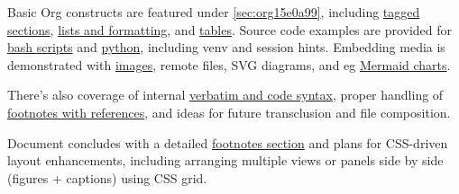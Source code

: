\documentclass[11pt]{article}
\begin{document}
Basic Org constructs are featured under \ref{sec:org15e0a99}, including \hyperref[sec:org37ce046]{tagged sections}, \hyperref[sec:org93ad3dd]{lists and formatting}, and \hyperref[sec:org82d6613]{tables}. Source code examples are provided for \hyperref[sec:org603edab]{bash scripts} and \hyperref[sec:org3497437]{python}, including venv and session hints. Embedding media is demonstrated with \hyperref[sec:orge89f838]{images}, remote files, SVG diagrams, and eg \hyperref[sec:orged0df6e]{Mermaid charts}. 

There's also coverage of internal \hyperref[sec:org51f3ec8]{verbatim and code syntax}, proper handling of \hyperref[sec:orgebe5961]{footnotes with references}, and ideas for future transclusion and file composition.

Document concludes with a detailed \hyperref[sec:orgebe5961]{footnotes section} and plans for CSS-driven layout enhancements, including arranging multiple views or panels side by side (figures + captions) using CSS grid.
\end{document}
